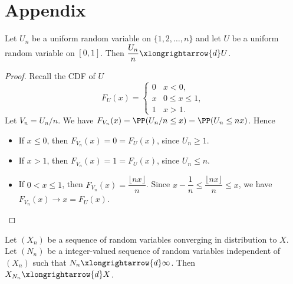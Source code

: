 \chapter{Appendix}

\begin{lemma}
  \label{lemma:average_uniform_convergence}
  Let $U_n$ be a uniform random variable on $\{1, 2, \ldots, n\}$ and let $U$ be a uniform random variable on $[0,1]$. Then $\dfrac{U_n}{n}\xlongrightarrow{d} U$.
\end{lemma}

\begin{proof}
  Recall the CDF of $U$
  $$F_U(x) = \begin{cases}
      0 & x < 0,         \\
      x & 0 \le x \le 1, \\
      1 & x > 1.
    \end{cases}$$
  Let $V_n = U_n/n$. We have $F_{V_n}(x) = \PP(U_n/n \le x) = \PP(U_n\le nx)$. Hence
  \begin{itemize}
    \item If $x\le 0$, then $F_{V_n}(x) = 0 = F_U(x)$, since $U_n\ge 1$.
    \item If $x > 1$, then $F_{V_n}(x) = 1 = F_U(x)$, since $U_n\le n$.
    \item If $0 < x \le 1$, then $F_{V_n}(x) = \dfrac{\lfloor nx \rfloor}{n}$. Since $x - \dfrac{1}{n} \le \dfrac{\lfloor nx \rfloor}{n} \le x$, we have $F_{V_n}(x) \to x = F_U(x)$.
  \end{itemize}
\end{proof}

\begin{lemma}
  \label{lemma:random_index_convergence}
  Let $(X_n)$ be a sequence of random variables converging in distribution to $X$. Let $(N_n)$ be a integer-valued sequence of random variables independent of $(X_n)$ such that $N_n \xlongrightarrow{d} \infty$. Then $X_{N_n} \xlongrightarrow{d} X$.
\end{lemma}

